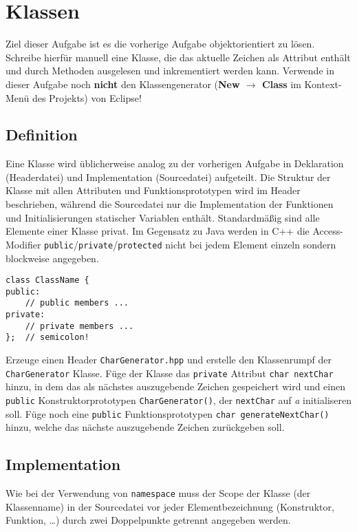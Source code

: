 \section{Klassen}
Ziel dieser Aufgabe ist es die vorherige Aufgabe objektorientiert zu lösen. Schreibe hierfür manuell eine Klasse, die das aktuelle Zeichen als Attribut enthält und durch Methoden ausgelesen und inkrementiert werden kann.
Verwende in dieser Aufgabe noch \textbf{nicht} den Klassengenerator (\textbf{New $\rightarrow$ Class} im Kontext-Menü des Projekts) von Eclipse!

\subsection{Definition}
Eine Klasse wird üblicherweise analog zu der vorherigen Aufgabe in Deklaration (Headerdatei) und Implementation (Sourcedatei) aufgeteilt.
Die Struktur der Klasse mit allen Attributen und Funktionsprototypen wird im Header beschrieben, während die Sourcedatei nur die Implementation der Funktionen und Initialisierungen statischer Variablen enthält.
Standardmäßig sind alle Elemente einer Klasse privat.
Im Gegensatz zu Java werden in C++ die Access-Modifier \texttt{public}/\texttt{private}/\texttt{protected} nicht bei jedem Element einzeln sondern blockweise angegeben.

\begin{lstlisting}
class ClassName {
public:
	// public members ...
private:
	// private members ...
};	// semicolon!
\end{lstlisting}

Erzeuge einen Header \texttt{CharGenerator.hpp} und erstelle den Klassenrumpf der \texttt{CharGenerator} Klasse.
Füge der Klasse das \texttt{private} Attribut \texttt{char nextChar} hinzu, in dem das als nächstes auszugebende Zeichen gespeichert wird und einen \texttt{public} Konstruktorprototypen \texttt{CharGenerator()}, der \texttt{nextChar} auf \emph{a} initialiseren soll.
Füge noch eine \texttt{public} Funktionsprototypen \texttt{char generateNextChar()} hinzu, welche das nächste auszugebende Zeichen zurückgeben soll.



\subsection{Implementation}
Wie bei der Verwendung von \texttt{namespace} muss der Scope der Klasse (der Klassenname) in der Sourcedatei vor jeder Elementbezeichnung (Konstruktor, Funktion, \dots) durch zwei Doppelpunkte getrennt angegeben werden.


